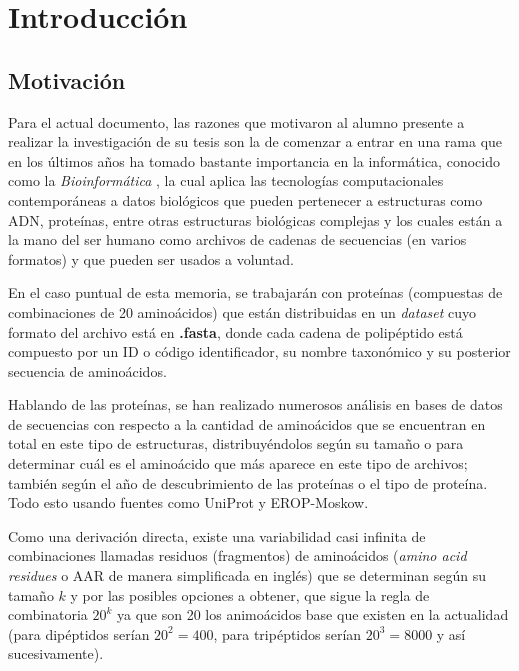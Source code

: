 \chapter*{Introducci\'on}

\section*{Motivación}

Para el actual documento, las razones que motivaron al alumno presente a realizar la investigación de su tesis son la de comenzar a 
entrar en una rama que en los últimos años ha tomado bastante importancia en la informática, conocido como la {\textit{Bioinformática}} \cite{bioinformatica}, la cual aplica las tecnologías computacionales contemporáneas a datos biológicos que pueden pertenecer a estructuras como ADN, proteínas, entre otras estructuras biológicas complejas y los cuales están a la mano del ser humano como archivos de cadenas de secuencias (en varios formatos) y que pueden ser usados a voluntad.

En el caso puntual de esta memoria, se trabajarán con proteínas (compuestas de combinaciones de 20 aminoácidos) que están distribuidas en un {\textit{dataset}} cuyo formato del archivo está en \textbf{.fasta}, donde cada cadena de polipéptido está compuesto por un ID o código identificador, su nombre taxonómico y su posterior secuencia de aminoácidos. 



Hablando de las proteínas, se han realizado numerosos análisis \cite{searching, array} en bases de datos de secuencias con respecto a la cantidad de aminoácidos que se encuentran en total en este tipo de estructuras, distribuyéndolos según su tamaño o para determinar cuál es el aminoácido que más aparece en este tipo de archivos; también según el año de descubrimiento de las proteínas o el tipo de proteína. Todo esto usando fuentes como UniProt y EROP-Moskow. 

Como una derivación directa, existe una variabilidad casi infinita de combinaciones llamadas residuos (fragmentos) de aminoácidos ({\textit{amino acid residues}} o AAR de manera simplificada en inglés) que se determinan según su tamaño $k$ y por las posibles opciones a obtener, que sigue la regla de combinatoria $20^{k}$ ya que son 20 los animoácidos base que existen en la actualidad (para dipéptidos serían $20^{2} = 400$, para tripéptidos serían $20^{3} = 8000$ y así sucesivamente).